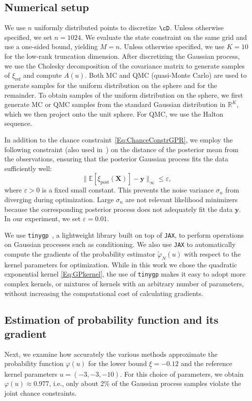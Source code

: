 \documentclass[%
onefignum,onetabnum]{siamonline250211}
\newcommand{\norm}[1]{\| #1 \|}
\newcommand{\bbR}{\mathbb R}
\renewcommand{\epsilon}{\varepsilon}
\begin{document}
\subsection{Numerical setup}
We use $n$ uniformly distributed points to discretize $\cD$. Unless otherwise specified, we set $n=1024$. We evaluate the state constraint on the same grid and use a one-sided bound, yielding $M=n$. Unless otherwise specified, we use $K=10$ for the low-rank truncation dimension. After discretizing the Gaussian process, we use the Cholesky decomposition of the covariance matrix to generate samples of $\xi_{\mathrm{ref}}$ and compute $A(u)$. Both MC and QMC (quasi-Monte Carlo) are used to generate samples for the uniform distribution on the sphere and for the remainder. To obtain samples of the uniform distribution on the sphere, we first generate MC or QMC samples from the standard Gaussian distribution in $\bbR^K$, which we then project onto the unit sphere. For QMC, we use the Halton sequence.

In addition to the chance constraint~\eqref{Eq:ChanceConstrGPR}, we employ the following constraint (also used in~\cite{PeYaZh-TAML20})  on the distance of the posterior mean from the observations, ensuring that the posterior Gaussian process fits the data sufficiently well:
\begin{equation}\label{Eq:HeurConstr}
    \norm{\mathbb{E}[\xi_\text{post}(\boldsymbol{X})]-\boldsymbol{y}}_\infty \le \epsilon,
\end{equation}
where $\epsilon>0$ is a fixed small constant.  This prevents the noise variance $\sigma_n$ from diverging during optimization. Large $\sigma_n$ are not relevant likelihood minimizers because the corresponding posterior process does not adequately fit the data $\boldsymbol{y}$. In our experiment, we set $\epsilon=0.01$.

We use {\tt tinygp}~\cite{tinygp}, a lightweight library built on top of {\tt JAX}, to perform operations on Gaussian processes such as conditioning. We also use {\tt JAX} to automatically compute the gradients of the probability estimator $\tilde\varphi_N(u)$ with respect to the kernel parameters for optimization. While in this work we chose the quadratic exponential kernel \eqref{Eq:GPkernel}, the use of {\tt tinygp} makes it easy to adopt more complex kernels, or mixtures of kernels with an arbitrary number of parameters, without increasing the computational cost of calculating gradients.

\subsection{Estimation of probability function and its gradient}\label{subsec:numerical-variance}
Next, we examine how accurately the various methods approximate the probability function $\varphi(u)$ for the lower bound $\underline{\xi}=-0.12$ and the reference kernel parameters $u=(-3,-3,-10)$. For this choice of parameters, we obtain $\varphi(u)\approx 0.977$, i.e., only about 2\% of the Gaussian process samples violate the joint chance constraints.
\end{document}
